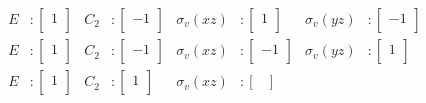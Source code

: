 \documentclass[../notes.tex]{subfiles}
\begin{document}
\begin{itemize}
\begin{itemize}
        \begin{align*}
            E &:
            \begin{bmatrix}
                1\\
            \end{bmatrix}&
                C_2 &:
                \begin{bmatrix}
                    -1\\
                \end{bmatrix}&
                    \sigma_v(xz) &:
                    \begin{bmatrix}
                        1\\
                    \end{bmatrix}&
                        \sigma_v(yz) &:
                        \begin{bmatrix}
                            -1\\
                        \end{bmatrix}\\
            E &:
            \begin{bmatrix}
                1\\
            \end{bmatrix}&
                C_2 &:
                \begin{bmatrix}
                    -1\\
                \end{bmatrix}&
                    \sigma_v(xz) &:
                    \begin{bmatrix}
                        -1\\
                    \end{bmatrix}&
                        \sigma_v(yz) &:
                        \begin{bmatrix}
                            1\\
                        \end{bmatrix}\\
            E &:
            \begin{bmatrix}
                1\\
            \end{bmatrix}&
                C_2 &:
                \begin{bmatrix}
                    1\\
                \end{bmatrix}&
                    \sigma_v(xz) &:
                    \begin{bmatrix}

\end{bmatrix}
\end{align*}
\end{itemize}
\end{itemize}
\end{document}
